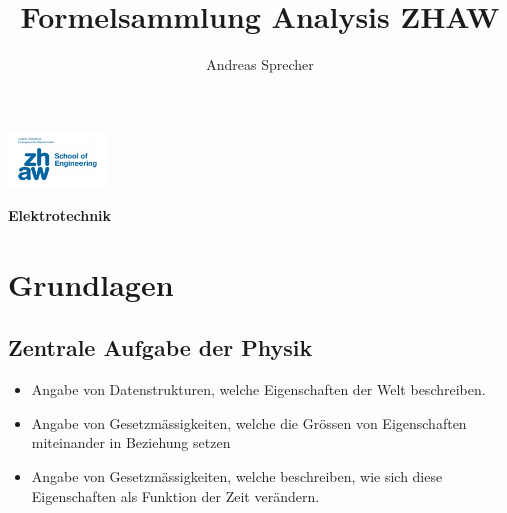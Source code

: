 \documentclass[8pt,a4paper]{scrartcl}
\title{Formelsammlung Analysis ZHAW}
\author{Andreas Sprecher}
\renewcommand{\emph}[1]{\textbf{#1}}                                                            %
\begin{document}
\begin{multicols*}{3}
\setlength{\columnseprule}{0.4pt}
    \parbox{3cm}{
        \includegraphics[height=1.5cm]{./img/Logo.jpeg}
    }
    \parbox{4cm}{
        \emph{\Large{Elektrotechnik}}
    }
    \vspace{-2mm} 

    \section{Grundlagen}
		\subsection{Zentrale Aufgabe der Physik}    
    			\begin{itemize}\itemsep0pt				
				\item Angabe von Datenstrukturen, welche Eigenschaften der Welt beschreiben.
				\item Angabe von Gesetzmässigkeiten, welche die Grössen von Eigenschaften miteinander in Beziehung setzen
				\item Angabe von Gesetzmässigkeiten, welche beschreiben, wie sich diese Eigenschaften als Funktion der Zeit verändern.
			\end{itemize}
    

\end{multicols*}
\end{document}

